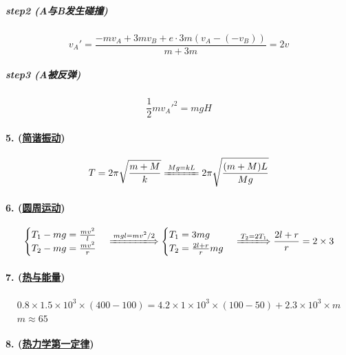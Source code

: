 \subparagraph{step2 (A与B发生碰撞)}

\begin{equation*}
    v_A'=\frac{-mv_A+3mv_B+e\cdot 3m(v_A-(-v_B))}{m+3m}=2v
\end{equation*}

\subparagraph{step3 (A被反弹)}

\begin{equation*}
    \frac12{mv_A'}^2=mgH
\end{equation*}

\paragraph{5. (\hyperref[subsec:简谐振动]{简谐振动})}

\begin{equation*}
    T=2\pi\sqrt{\frac{m+M}{k}}
    \xlongequal{Mg=kL}
    2\pi\sqrt{\frac{(m+M)L}{Mg}}
\end{equation*}

\paragraph{6. (\hyperref[subsec:圆周运动]{圆周运动})}

\begin{equation*}
    \begin{cases}
        T_1-mg=\frac{mv^2}{l}\\
        T_2-mg=\frac{mv^2}{r}
    \end{cases}\xLongrightarrow{mgl=mv^2/2}
    \begin{cases}
        T_1=3mg\\
        T_2=\frac{2l+r}{r}mg
    \end{cases}\xLongrightarrow{T_2=2T_1}
    \frac{2l+r}{r}=2\times3
\end{equation*}

\paragraph{7. (\hyperref[sec:热与能量]{热与能量})}

\begin{gather*}
    0.8\times1.5\times10^3\times(400-100)=
    4.2\times1\times10^3\times(100-50)+2.3\times10^3\times m\\
    m\approx65
\end{gather*}

\paragraph{8. (\hyperref[subsec:热力学第一定律]{热力学第一定律})}

